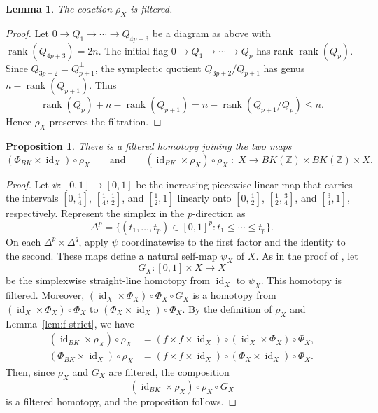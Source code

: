 \documentclass[12 pt]{amsart}
\newcommand{\ZZ}{\mathbb{Z}}
\newcommand{\rank}{\operatorname{rank}}
\newcommand{\<}{\langle}
\renewcommand{\>}{\rangle}
\newtheorem{proposition}[theorem]{Proposition}
\newtheorem{lemma}[theorem]{Lemma}
\theoremstyle{definition}
\newcommand{\id}{\operatorname{id}}
\begin{document}
\begin{lemma}\label{lem:rhofilt}
The coaction $\rho_X$ is filtered.
\end{lemma}

\begin{proof}
Let $0 \to Q_1 \to \cdots \to Q_{4p + 3}$ be a diagram as above with $\rank(Q_{4p + 3}) = 2n$. The initial flag $0 \to Q_1 \to \cdots \to Q_p$ has rank $\rank(Q_p)$. Since $Q_{3p + 2} = Q_{p + 1}^{\perp}$, the symplectic quotient $Q_{3p + 2}/Q_{p + 1}$ has genus $n - \rank(Q_{p + 1})$. Thus
\[
\rank(Q_p) + n - \rank(Q_{p + 1}) = n - \rank(Q_{p + 1}/Q_p) \leq n.
\]
Hence $\rho_X$ preserves the filtration.
\end{proof}

\begin{proposition}\label{prop:coassoc}
There is a filtered homotopy joining the two maps
\[ (\Phi_{BK} \times \id_X) \circ \rho_X \qquad \text{and} \qquad (\id_{BK} \times \rho_X) \circ \rho_X \; \colon \; X \longrightarrow BK(\ZZ) \times BK(\ZZ) \times X. \]

\end{proposition}

\begin{proof}
Let $\psi \colon [0, 1] \to [0, 1]$ be the increasing piecewise-linear map that carries the intervals $[0, \tfrac14]$, $[\tfrac14, \tfrac12]$, and $[\tfrac12, 1]$ linearly onto $[0, \tfrac12]$, $[\tfrac12, \tfrac34]$, and $[\tfrac34, 1]$, respectively. Represent the simplex in the $p$-direction as
\[
\Delta^p = \{(t_1, \ldots, t_p) \in [0, 1]^p : t_1 \leq \cdots \leq t_p\}.
\]
On each $\Delta^p \times \Delta^q$, apply $\psi$ coordinatewise to the first factor and the identity to the second. These maps define a natural self-map $\psi_X$ of $X$. As in the proof of \cite[Proposition~3.11]{BCGP}, let
\[
G_X \colon [0, 1] \times X \longrightarrow X
\]
be the simplexwise straight-line homotopy from $\id_X$ to $\psi_X$. This homotopy is filtered. Moreover, $(\id_X \times \Phi_X) \circ \Phi_X \circ G_X$ is a homotopy from $(\id_X \times \Phi_X) \circ \Phi_X$ to $(\Phi_X \times \id_X) \circ \Phi_X$. By the definition of $\rho_X$ and Lemma~\ref{lem:f-strict}, we have
\[ \begin{aligned}
(\id_{BK} \times \rho_X) \circ \rho_X & = (f \times f \times \id_X) \circ (\id_X \times \Phi_X) \circ \Phi_X,\\
(\Phi_{BK} \times \id_X) \circ \rho_X & = (f \times f \times \id_X) \circ (\Phi_X \times \id_X) \circ \Phi_X.
\end{aligned} \]
Then, since $\rho_X$ and $G_X$ are filtered, the composition 
\[
(\id_{BK} \times \rho_X) \circ \rho_X \circ G_X
\]
is a filtered homotopy, and the proposition follows.
\end{proof}
\end{document}

